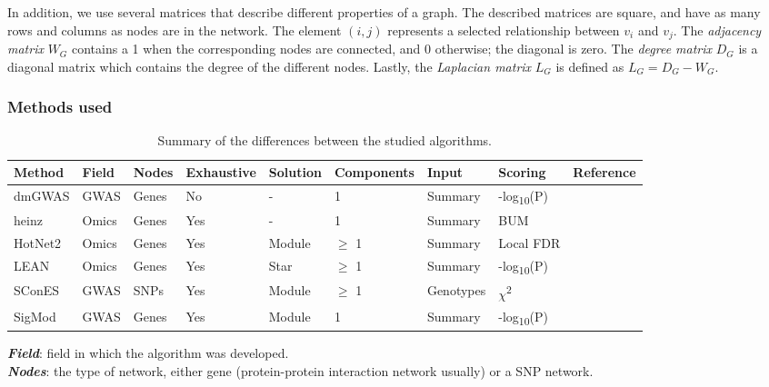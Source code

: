 \documentclass[twocolumn, 10pt]{article}
\begin{document}
In addition, we use several matrices that describe different properties of a graph. The described matrices are square, and have as many rows and columns as nodes are in the network. The element $(i,j)$ represents a  selected relationship between $v_i$ and $v_j$. The \emph{adjacency matrix} $W_G$ contains a 1 when the corresponding nodes are connected, and 0 otherwise; the diagonal is zero. The \emph{degree matrix} $D_G$ is a diagonal matrix which contains the degree of the different nodes. Lastly, the \emph{Laplacian matrix} $L_G$ is defined as $L_G = D_G - W_G$.

\subsubsection{Methods used}
\label{methods:methods}

\begin{table}[htbp]
  \caption{\label{tab:method_comparison} Summary of the differences between the studied algorithms.}
  \centering
  \begin{threeparttable}
    \begin{tabular}{l|llllllll}
      Method & Field & Nodes & Exhaustive & Solution & Components & Input & Scoring & Reference\\
      \hline
      dmGWAS & GWAS & Genes & No & - & 1 & Summary & -log\textsubscript{10}(P) & \cite{jia_dmgwas:_2011}\\
      heinz & Omics & Genes & Yes & - & 1 & Summary & BUM & \cite{dittrich_identifying_2008}\\
      HotNet2 & Omics & Genes & Yes & Module & \(\ge\) 1 & Summary & Local FDR & \cite{leiserson_pan-cancer_2015}\\
      LEAN & Omics & Genes & Yes & Star & \(\ge\) 1 & Summary & -log\textsubscript{10}(P) & \cite{gwinner_network-based_2016}\\
      SConES & GWAS & SNPs & Yes & Module & \(\ge\) 1 & Genotypes & \(\chi\)\textsuperscript{2} & \cite{azencott_efficient_2013}\\
      SigMod & GWAS & Genes & Yes & Module & 1 & Summary & -log\textsubscript{10}(P) & \cite{liu_sigmod:_2017}\\
    \end{tabular}
    \begin{tablenotes}
      \textbf{\emph{Field}}: field in which the algorithm was developed.\\
      \textbf{\emph{Nodes}}: the type of network, either gene (protein-protein interaction network usually) or a SNP network.\\

\end{tablenotes}
\end{threeparttable}
\end{table}
\end{document}
